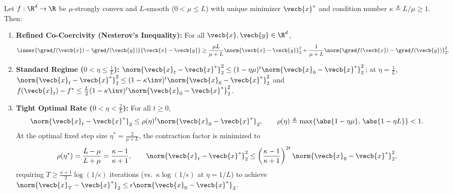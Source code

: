 \documentclass[../../../../master.tex]{subfiles}
\begin{document}
\begin{coremath}
\label{thm:gdconv:sc_linear}
Let $f : \R^d \to \R$ be $\mu$-strongly convex and $L$-smooth ($0 < \mu \le L$) with unique minimizer $\vecb{x}^*$ and condition number $\kappa \triangleq L/\mu \ge 1$. Then:
\begin{enumerate}
  \item \textbf{Refined Co-Coercivity (Nesterov's Inequality):} For all $\vecb{x}, \vecb{y} \in \R^d$,
  \begin{equation}
  \label{eq:gdconv:nesterov_ineq}
    \inner{\grad f(\vecb{x}) - \grad f(\vecb{y})}{\vecb{x}-\vecb{y}} \ge \frac{\mu L}{\mu + L}\norm{\vecb{x}-\vecb{y}}_2^2 + \frac{1}{\mu + L}\norm{\grad f(\vecb{x}) - \grad f(\vecb{y})}_2^2.
  \end{equation}
  \item \textbf{Standard Regime ($0 < \eta \le \frac{1}{L}$):} $\norm{\vecb{x}_t - \vecb{x}^*}_2^2 \le (1 - \eta\mu)^t \norm{\vecb{x}_0 - \vecb{x}^*}_2^2$; at $\eta = \frac{1}{L}$, $\norm{\vecb{x}_t - \vecb{x}^*}_2^2 \le (1 - \kappa\inv)^t \norm{\vecb{x}_0 - \vecb{x}^*}_2^2$ and $f(\vecb{x}_t) - f^* \le \frac{L}{2}(1 - \kappa\inv)^t \norm{\vecb{x}_0-\vecb{x}^*}_2^2$.
  \item \textbf{Tight Optimal Rate ($0 < \eta < \frac{2}{L}$):} For all $t \ge 0$,
  \begin{equation}
  \label{eq:gdconv:sc_tight}
    \norm{\vecb{x}_t - \vecb{x}^*}_2 \le \rho(\eta)^t \norm{\vecb{x}_0 - \vecb{x}^*}_2, \qquad \rho(\eta) \triangleq \max\{\abs{1 - \eta\mu},\, \abs{1 - \eta L}\} < 1.
  \end{equation}
  At the optimal fixed step size $\eta^* = \frac{2}{\mu + L}$, the contraction factor is minimized to
  \begin{equation}
  \label{eq:gdconv:sc_optimal_eta}
    \rho(\eta^*) = \frac{L - \mu}{L + \mu} = \frac{\kappa - 1}{\kappa + 1}, \qquad \norm{\vecb{x}_t - \vecb{x}^*}_2^2 \le \left(\frac{\kappa - 1}{\kappa + 1}\right)^{2t}\norm{\vecb{x}_0 - \vecb{x}^*}_2^2,
  \end{equation}
  requiring $T \ge \frac{\kappa + 1}{2}\log(1/\epsilon)$ iterations (vs.\ $\kappa \log(1/\epsilon)$ at $\eta = 1/L$) to achieve $\norm{\vecb{x}_T - \vecb{x}^*}_2 \le \epsilon\norm{\vecb{x}_0 - \vecb{x}^*}_2$.
\end{enumerate}
\end{coremath}
\end{document}

